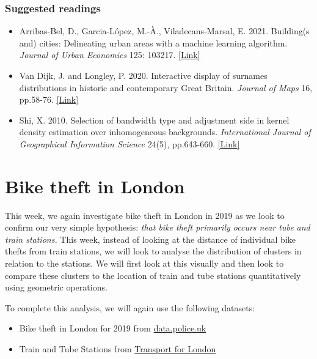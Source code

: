 \documentclass[
]{book}
\providecommand{\tightlist}{%
  \setlength{\itemsep}{0pt}\setlength{\parskip}{0pt}}
\begin{document}
\hypertarget{suggested-readings-7}{%
\subsubsection*{Suggested readings}\label{suggested-readings-7}}

\begin{itemize}
\tightlist
\item
  Arribas-Bel, D., Garcia-López, M.-À., Viladecans-Marsal, E. 2021. Building(s and) cities: Delineating urban areas with a machine learning algorithm. \emph{Journal of Urban Economics} 125: 103217. \href{https://doi.org/10.1016/j.jue.2019.103217}{{[}Link{]}}
\item
  Van Dijk, J. and Longley, P. 2020. Interactive display of surnames distributions in historic and contemporary Great Britain. \emph{Journal of Maps} 16, pp.58-76. \href{https://doi.org/10.1080/17445647.2020.1746418}{{[}Link{]}}
\item
  Shi, X. 2010. Selection of bandwidth type and adjustment side in kernel density estimation over inhomogeneous backgrounds. \emph{International Journal of Geographical Information Science} 24(5), pp.643-660. \href{https://doi.org/10.1080/13658810902950625}{{[}Link{]}}
\end{itemize}

\hypertarget{bike-theft-w08}{%
\section{Bike theft in London}\label{bike-theft-w08}}

This week, we again investigate bike theft in London in 2019 as we look to confirm our very simple hypothesis: \emph{that bike theft primarily occurs near tube and train stations.} This week, instead of looking at the distance of individual bike thefts from train stations, we will look to analyse the distribution of clusters in relation to the stations. We will first look at this visually and then look to compare these clusters to the location of train and tube stations quantitatively using geometric operations.

To complete this analysis, we will again use the following datasets:

\begin{itemize}
\tightlist
\item
  Bike theft in London for 2019 from \href{https://tfl.gov.uk/}{data.police.uk}
\item
  Train and Tube Stations from \href{https://data.police.uk/}{Transport for London}
\end{itemize}
\end{document}

